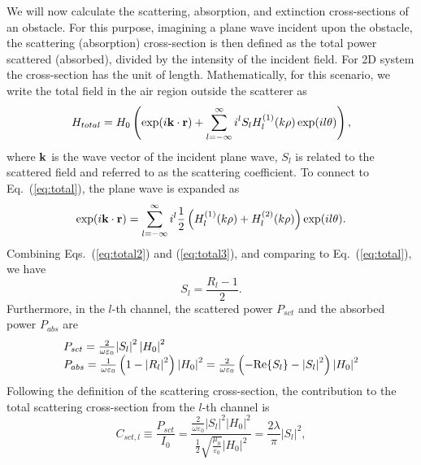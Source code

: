 \documentclass[preprint,aps]{revtex4}
\begin{document}
We will now calculate the scattering, absorption, and extinction
cross-sections of an obstacle. For this purpose, imagining a plane
wave incident upon the obstacle, the scattering (absorption)
cross-section is then defined as the total power scattered
(absorbed), divided by the intensity of the incident field. For 2D
system the cross-section has the unit of length. Mathematically, for
this scenario, we write the total field in the air region outside
the scatterer as
\begin{equation}
\label{eq:total2} {H_{total}} = {H_0}\left( {\exp (i{\bf{k}} \cdot
{\bf{r}}) + \sum\limits_{l =  - \infty }^\infty
{{i^l}{S_l}H_l^{(1)}(k\rho )\exp (il\theta )} } \right) ,
\end{equation} where
${\bf{k}}$ is the wave vector of the incident plane wave, $S_l$ is
related to the scattered field and referred to as the scattering
coefficient. To connect to Eq.~(\ref{eq:total}), the plane wave is
expanded as
\begin{equation}
\label{eq:total3} \exp (i{\bf{k}} \cdot {\bf{r}}) = \sum\limits_{l =
- \infty }^\infty  {{i^l}\frac{1}{2}\left( {H_l^{(1)}(k\rho ) +
H_l^{(2)}(k\rho )} \right) \exp (il\theta )}. \end{equation}
Combining Eqs.~(\ref{eq:total2}) and (\ref{eq:total3}), and
comparing to Eq.~(\ref{eq:total}), we have
\begin{equation}
\label{eq:relation} {S_l} = \frac{{{R_l} - 1}}{2}.
\end{equation}
Furthermore, in the $l$-th channel, the scattered power $P_{sct}$
and the absorbed power $P_{abs}$ are
\begin{equation}
\begin{array}{l}
 {P_{sct}} = \frac{2}{{\omega {\varepsilon _0}}}{\left| {{S_l}} \right|^2}\left| {H_0} \right|^2 \\
 {P_{abs}} = \frac{1}{{\omega {\varepsilon _0}}}\left( {1 - {{\left| {{R_l}} \right|}^2}} \right)\left| {H_0} \right|^2 = \frac{2}{{\omega {\varepsilon _0}}}\left( { - {\mathop{\rm Re}\nolimits} \{ {S_l}\}  - {{\left| {{S_l}} \right|}^2}} \right)\left| {H_0} \right| ^2\\
 \end{array}
\end{equation}
Following the definition of the scattering cross-section, the
contribution to the total scattering cross-section from the $l$-th
channel is
\begin{equation}
C_{sct,l} \equiv \frac{{{P_{sct}}}}{{{I_0}}} = \frac{{\frac{2
}{{\omega {\varepsilon _0}}}{{\left| {{S_l}} \right|}^2}{{\left|
{{H_0}} \right|}^2}}}{{\frac{1}{2}\sqrt {\frac{{{\mu
_0}}}{{{\varepsilon _0}}}} {{\left| {{H_0}} \right|}^2}}} =
\frac{{2\lambda }}{ \pi}{\left| {{S_l}} \right|^2},\end{equation}
\end{document}

